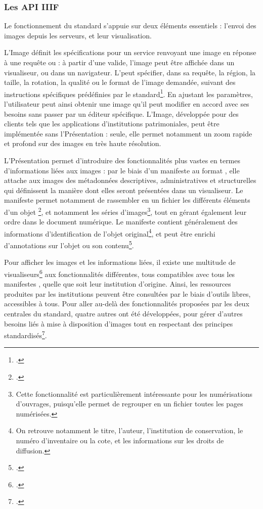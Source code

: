     \subsubsection{Les API IIIF}
Le fonctionnement du standard \iiif s'appuie sur deux éléments essentiels : l'envoi des images depuis les serveurs, et leur visualisation. 

L'\api Image définit les spécifications pour un service renvoyant une image en réponse à une requête \http ou \https : à partir d'une \uri valide, l'image peut être affichée dans un visualiseur, ou dans un navigateur. L'\uri peut spécifier, dans sa requête, la région, la taille, la rotation, la qualité ou le format de l'image demandée, suivant des instructions spécifiques prédéfinies par le standard\footcite{ImageAPI}. En ajustant les paramètres, l'utilisateur peut ainsi obtenir une image qu'il peut modifier en accord avec ses besoins sans passer par un éditeur spécifique. L'\api Image, développée pour des clients tels que les applications d'institutions patrimoniales, peut être implémentée sans l'\api Présentation : seule, elle permet notamment un zoom rapide et profond sur des images en très haute résolution.

L'\api Présentation permet d'introduire des fonctionnalités plus vastes en termes d'informations liées aux images : par le biais d'un manifeste au format \json, elle attache aux images des métadonnées descriptives, administratives et structurelles qui définissent la manière dont elles seront présentées dans un visualiseur. Le manifeste permet notamment de rassembler en un fichier les différents éléments d'un objet \iiif\footcite{HowItWorks}, et notamment les séries d'images\footnote{Cette fonctionnalité est particulièrement intéressante pour les numérisations d'ouvrages, puisqu'elle permet de regrouper en un fichier toutes les pages numérisées.}, tout en gérant également leur ordre dans le document numérique. Le manifeste contient généralement des informations d'identification de l'objet original\footnote{On retrouve notamment le titre, l'auteur, l'institution de conservation, le numéro d'inventaire ou la cote, et les informations sur les droits de diffusion.}, et peut être enrichi d'annotations sur l'objet ou son contenu\footcite{PresentationAPI}.

Pour afficher les images et les informations liées, il existe une multitude de visualiseurs\footcite{IIIFViewers} aux fonctionnalités différentes, tous compatibles avec tous les manifestes \iiif, quelle que soit leur institution d'origine. Ainsi, les ressources produites par les institutions peuvent être consultées par le biais d'outils libres, accessibles à tous. Pour aller au-delà des fonctionnalités proposées par les deux \api centrales du standard, quatre autres \api ont été développées, pour gérer d'autres besoins liés à mise à disposition d'images tout en respectant des principes standardisés\footcite{HowItWorks}.
    
